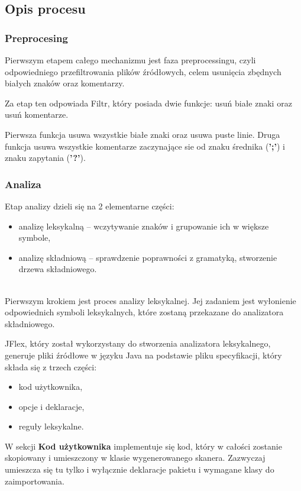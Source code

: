 \documentclass[a4paper,12pt]{article}
\begin{document}
\newpage

\subsection{Opis procesu}

\subsubsection{Preprocesing}

Pierwszym etapem całego mechanizmu jest faza preprocessingu, czyli odpowiedniego przefiltrowania plików źródłowych, celem usunięcia zbędnych białych znaków oraz komentarzy.

Za etap ten odpowiada Filtr, który posiada dwie funkcje: usuń białe znaki oraz usuń komentarze.

Pierwsza funkcja usuwa wszystkie białe znaki oraz usuwa puste linie. Druga funkcja usuwa wszystkie komentarze zaczynające sie od znaku średnika (\textbf{';'}) i znaku zapytania (\textbf{'?'}).

\subsubsection{Analiza}

Etap analizy dzieli się na 2 elementarne części:
\begin{itemize}
\item analizę leksykalną – wczytywanie znaków i grupowanie ich w większe symbole,
\item analizę składniową – sprawdzenie poprawności z gramatyką, stworzenie drzewa składniowego.
\end{itemize}
\\

Pierwszym krokiem jest proces analizy leksykalnej. Jej zadaniem jest wyłonienie odpowiednich symboli leksykalnych, które zostaną przekazane do analizatora składniowego.

JFlex\cite{jflex}, który został wykorzystany do stworzenia analizatora leksykalnego, generuje pliki źródłowe w języku Java na podstawie pliku specyfikacji, który składa się z trzech części:
\begin{itemize}
\item kod użytkownika,
\item opcje i deklaracje,
\item reguły leksykalne.
\end{itemize}

W sekcji \textbf{Kod użytkownika} implementuje się kod, który w całości zostanie skopiowany i umieszczony w klasie wygenerowanego skanera. Zazwyczaj umieszcza się tu tylko i wyłącznie deklaracje pakietu i wymagane klasy do zaimportowania.
\end{document}

